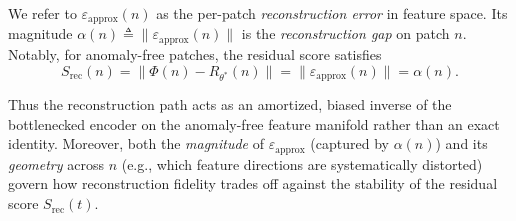 \documentclass{article}
\theoremstyle{plain}
\theoremstyle{definition}
\theoremstyle{remark}
\begin{document}
We refer to $\varepsilon_{\mathrm{approx}}(n)$ as the per-patch \emph{reconstruction error} in feature space.
Its magnitude $\alpha(n) \triangleq \|\varepsilon_{\mathrm{approx}}(n)\|$ is the \emph{reconstruction gap} on patch $n$.
Notably, for anomaly-free patches, the residual score satisfies
\[
S_{\mathrm{rec}}(n)
= \|\Phi(n)-R_{\theta^*}(n)\|
= \|\varepsilon_{\mathrm{approx}}(n)\|
= \alpha(n).
\]



Thus the reconstruction path acts as an amortized, biased inverse of the
bottlenecked encoder on the anomaly-free feature manifold rather than an exact
identity.
Moreover, both the \emph{magnitude} of $\varepsilon_{\mathrm{approx}}$ (captured by $\alpha(n)$) and its \emph{geometry} across $n$
(e.g., which feature directions are systematically distorted)
govern how reconstruction fidelity trades off against the stability of the residual score $S_{\mathrm{rec}}(t)$.
\end{document}
